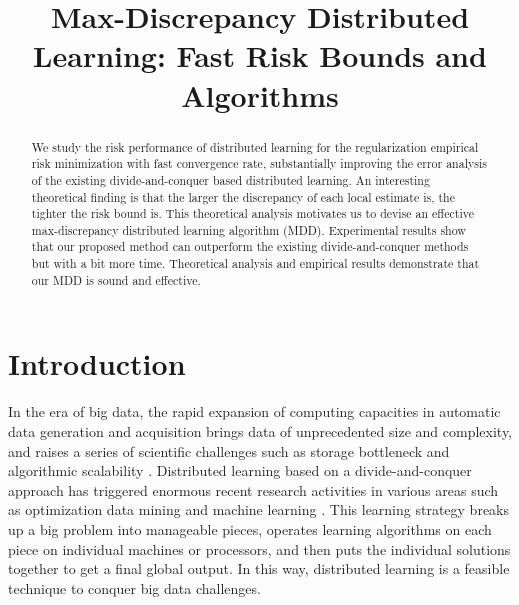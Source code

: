 \documentclass{article}
\title{Max-Discrepancy Distributed Learning: Fast Risk Bounds and Algorithms}
\author{
}
\begin{document}

\maketitle

\begin{abstract}
  We study the risk performance of distributed learning for the regularization empirical
  risk minimization with fast convergence rate,
  substantially improving the error analysis of the existing divide-and-conquer based distributed learning.
  An interesting theoretical finding is that the larger the discrepancy of each local estimate is, the tighter the risk bound is.
  This theoretical analysis motivates us to devise an effective max-discrepancy distributed learning algorithm (MDD).
  Experimental results show that our proposed method can outperform the existing divide-and-conquer methods
  but with a bit more time.
  Theoretical analysis and empirical results demonstrate that our MDD  is sound and effective.
\end{abstract}
\section{Introduction}
In the era of big data, the rapid expansion of computing capacities in automatic data generation
and acquisition brings data of unprecedented size and complexity, and raises a series
of scientific challenges such as storage bottleneck and algorithmic scalability \cite{zhou2014big,Zhang2013,lin2017distributed}.
Distributed learning based on a divide-and-conquer approach has triggered enormous
recent research activities in various areas such as optimization \cite{zhang2012communication}
data mining \cite{wu2014data} and machine learning \cite{gillick2006mapreduce}.
This learning strategy breaks up a big problem into manageable
pieces, operates learning algorithms on each piece on individual machines or
processors, and then puts the individual solutions together to get a final global output.
In this way, distributed learning is a feasible technique to conquer big data challenges.
\end{document}
